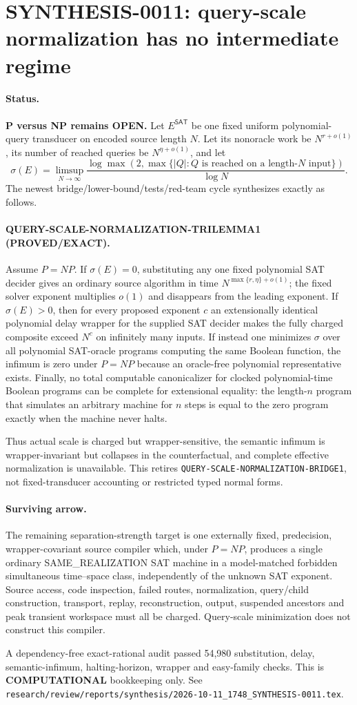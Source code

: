 \section*{SYNTHESIS-0011: query-scale normalization has no intermediate regime}

\paragraph{Status.}
\textbf{P versus NP remains OPEN.}
Let $E^{\mathsf{SAT}}$ be one fixed uniform polynomial-query transducer on
encoded source length $N$.  Let its nonoracle work be $N^{r+o(1)}$, its
number of reached queries be $N^{\eta+o(1)}$, and let
\[
 \sigma(E)=\limsup_{N\to\infty}
 \frac{\log \max(2,\max\{|Q|:Q\text{ is reached on a length-}N\text{ input}\})}
      {\log N}.
\]
The newest bridge/lower-bound/tests/red-team cycle synthesizes exactly as
follows.

\paragraph{QUERY-SCALE-NORMALIZATION-TRILEMMA1 (PROVED/EXACT).}
Assume $P=NP$.
If $\sigma(E)=0$, substituting any one fixed polynomial SAT decider gives an
ordinary source algorithm in time $N^{\max\{r,\eta\}+o(1)}$; the fixed
solver exponent multiplies $o(1)$ and disappears from the leading exponent.
If $\sigma(E)>0$, then for every proposed exponent $c$ an extensionally
identical polynomial delay wrapper for the supplied SAT decider makes the
fully charged composite exceed $N^c$ on infinitely many inputs.
If instead one minimizes $\sigma$ over all polynomial SAT-oracle programs
computing the same Boolean function, the infimum is zero under $P=NP$ because
an oracle-free polynomial representative exists.  Finally, no total
computable canonicalizer for clocked polynomial-time Boolean programs can be
complete for extensional equality: the length-$n$ program that simulates an
arbitrary machine for $n$ steps is equal to the zero program exactly when the
machine never halts.

Thus actual scale is charged but wrapper-sensitive, the semantic infimum is
wrapper-invariant but collapses in the counterfactual, and complete effective
normalization is unavailable.  This retires
\texttt{QUERY-SCALE-NORMALIZATION-BRIDGE1}, not fixed-transducer accounting or
restricted typed normal forms.

\paragraph{Surviving arrow.}
The remaining separation-strength target is one externally fixed, predecision,
wrapper-covariant source compiler which, under $P=NP$, produces a single
ordinary SAME\_REALIZATION SAT machine in a model-matched forbidden
simultaneous time--space class, independently of the unknown SAT exponent.
Source access, code inspection, failed routes, normalization, query/child
construction, transport, replay, reconstruction, output, suspended ancestors
and peak transient workspace must all be charged.  Query-scale minimization
does not construct this compiler.

A dependency-free exact-rational audit passed 54,980 substitution, delay,
semantic-infimum, halting-horizon, wrapper and easy-family checks.  This is
\textbf{COMPUTATIONAL} bookkeeping only.  See
\texttt{research/review/reports/synthesis/2026-10-11\_1748\_SYNTHESIS-0011.tex}.

